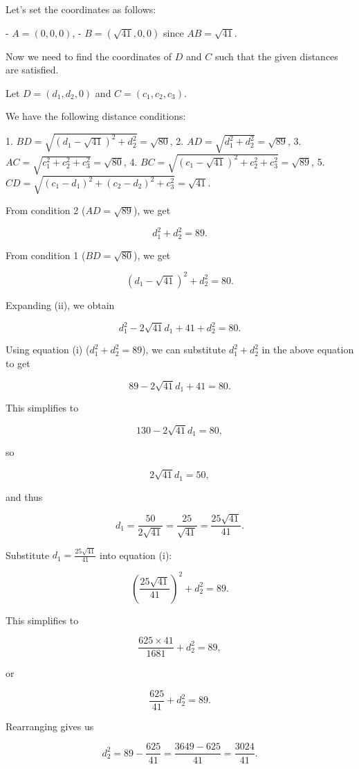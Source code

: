 Let's set the coordinates as follows:

- $A = (0, 0, 0)$,
- $B = (\sqrt{41}, 0, 0)$ since $AB = \sqrt{41}$.

Now we need to find the coordinates of $D$ and $C$ such that the given distances are satisfied.

Let $D = (d_1, d_2, 0)$ and $C = (c_1, c_2, c_3)$.

We have the following distance conditions:

1. $BD = \sqrt{(d_1 - \sqrt{41})^2 + d_2^2} = \sqrt{80}$,
2. $AD = \sqrt{d_1^2 + d_2^2} = \sqrt{89}$,
3. $AC = \sqrt{c_1^2 + c_2^2 + c_3^2} = \sqrt{80}$,
4. $BC = \sqrt{(c_1 - \sqrt{41})^2 + c_2^2 + c_3^2} = \sqrt{89}$,
5. $CD = \sqrt{(c_1 - d_1)^2 + (c_2 - d_2)^2 + c_3^2} = \sqrt{41}$.

From condition 2 ($AD = \sqrt{89}$), we get

\[ d_1^2 + d_2^2 = 89. \tag*{(i)} \]

From condition 1 ($BD = \sqrt{80}$), we get

\[ (d_1 - \sqrt{41})^2 + d_2^2 = 80. \tag*{(ii)} \]

Expanding (ii), we obtain

\[ d_1^2 - 2 \sqrt{41} d_1 + 41 + d_2^2 = 80. \]

Using equation (i) ($d_1^2 + d_2^2 = 89$), we can substitute $d_1^2 + d_2^2$ in the above equation to get

\[ 89 - 2 \sqrt{41} d_1 + 41 = 80. \]

This simplifies to

\[ 130 - 2 \sqrt{41} d_1 = 80, \]

so

\[ 2 \sqrt{41} d_1 = 50, \]

and thus

\[ d_1 = \frac{50}{2 \sqrt{41}} = \frac{25}{\sqrt{41}} = \frac{25 \sqrt{41}}{41}. \]

Substitute $d_1 = \frac{25 \sqrt{41}}{41}$ into equation (i):

\[ \left(\frac{25 \sqrt{41}}{41}\right)^2 + d_2^2 = 89. \]

This simplifies to

\[ \frac{625 \times 41}{1681} + d_2^2 = 89, \]

or

\[ \frac{625}{41} + d_2^2 = 89. \]

Rearranging gives us

\[ d_2^2 = 89 - \frac{625}{41} = \frac{3649 - 625}{41} = \frac{3024}{41}. \]

